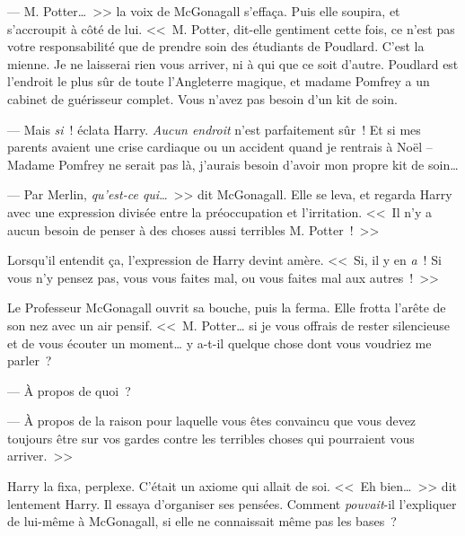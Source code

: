 --- M. Potter…~>> la voix de McGonagall s'effaça. Puis elle soupira, et s'accroupit à côté de lui. <<~M. Potter, dit-elle gentiment cette fois, ce n'est pas votre responsabilité que de prendre soin des étudiants de Poudlard. C'est la mienne. Je ne laisserai rien vous arriver, ni à qui que ce soit d'autre. Poudlard est l'endroit le plus sûr de toute l'Angleterre magique, et madame Pomfrey a un cabinet de guérisseur complet. Vous n'avez pas besoin d'un kit de soin.

--- Mais \emph{si}~! éclata Harry. \emph{Aucun endroit} n'est parfaitement sûr~! Et si mes parents avaient une crise cardiaque ou un accident quand je rentrais à Noël -- Madame Pomfrey ne serait pas là, j'aurais besoin d'avoir mon propre kit de soin…

--- Par Merlin, \emph{qu'est-ce qui}…~>> dit McGonagall. Elle se leva, et regarda Harry avec une expression divisée entre la préoccupation et l'irritation. <<~Il n'y a aucun besoin de penser à des choses aussi terribles M. Potter~!~>>

Lorsqu'il entendit ça, l'expression de Harry devint amère. <<~Si, il y en \emph{a}~! Si vous n'y pensez pas, vous vous faites mal, ou vous faites mal aux autres~!~>>

Le Professeur McGonagall ouvrit sa bouche, puis la ferma. Elle frotta l'arête de son nez avec un air pensif.
<<~M. Potter… si je vous offrais de rester silencieuse et de vous écouter un moment… y a-t-il quelque chose dont vous voudriez me parler~?

--- À propos de quoi~?

--- À propos de la raison pour laquelle vous êtes convaincu que vous devez toujours être sur vos gardes contre les terribles choses qui pourraient vous arriver.~>>

Harry la fixa, perplexe. C'était un axiome qui allait de soi. <<~Eh bien…~>> dit lentement Harry. Il essaya d'organiser ses pensées. Comment \emph{pouvait}-il l'expliquer de lui-même à McGonagall, si elle ne connaissait même pas les bases~?

